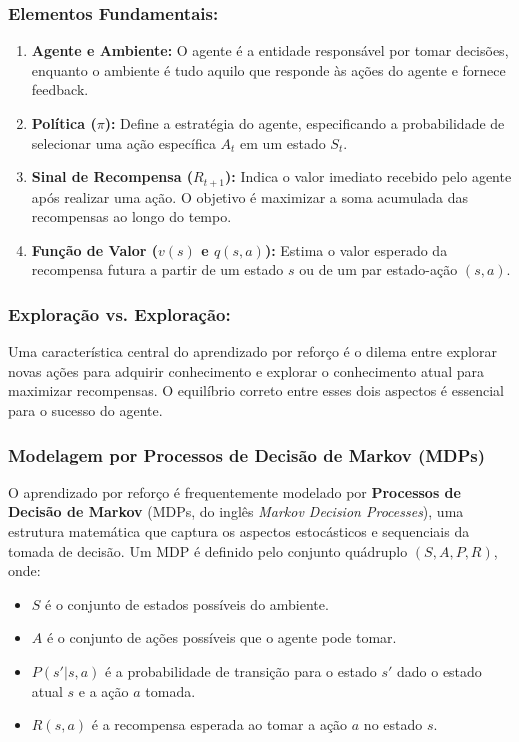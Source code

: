 \subsubsection*{Elementos Fundamentais:}
\begin{enumerate}
    \item \textbf{Agente e Ambiente:} O agente é a entidade responsável por tomar decisões, enquanto o ambiente é tudo aquilo que responde às ações do agente e fornece feedback.
    \item \textbf{Política (\(\pi\)):} Define a estratégia do agente, especificando a probabilidade de selecionar uma ação específica \( A_t \) em um estado \( S_t \).
    \item \textbf{Sinal de Recompensa (\(R_{t+1}\)):} Indica o valor imediato recebido pelo agente após realizar uma ação. O objetivo é maximizar a soma acumulada das recompensas ao longo do tempo.
    \item \textbf{Função de Valor (\(v(s)\) e \(q(s, a)\)):} Estima o valor esperado da recompensa futura a partir de um estado \( s \) ou de um par estado-ação \( (s, a) \).
\end{enumerate}

\subsubsection*{Exploração vs. Exploração:}
Uma característica central do aprendizado por reforço é o dilema entre explorar novas ações para adquirir conhecimento e explorar o conhecimento atual para maximizar recompensas. O equilíbrio correto entre esses dois aspectos é essencial para o sucesso do agente.

\subsubsection*{Modelagem por Processos de Decisão de Markov (MDPs)}

O aprendizado por reforço é frequentemente modelado por \textbf{Processos de Decisão de Markov} (MDPs, do inglês \textit{Markov Decision Processes}), uma estrutura matemática que captura os aspectos estocásticos e sequenciais da tomada de decisão. Um MDP é definido pelo conjunto quádruplo \((S, A, P, R)\), onde:

\begin{itemize}
    \item \(S\) é o conjunto de estados possíveis do ambiente.
    \item \(A\) é o conjunto de ações possíveis que o agente pode tomar.
    \item \(P(s'|s, a)\) é a probabilidade de transição para o estado \(s'\) dado o estado atual \(s\) e a ação \(a\) tomada.
    \item \(R(s, a)\) é a recompensa esperada ao tomar a ação \(a\) no estado \(s\).
\end{itemize}

